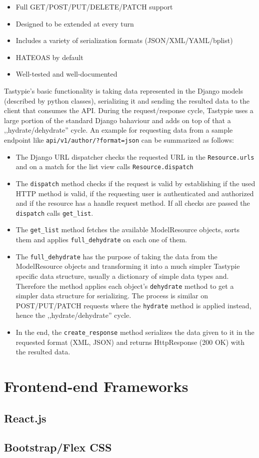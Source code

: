 \begin{itemize}
	\item Full GET/POST/PUT/DELETE/PATCH support
	\item Designed to be extended at every turn
	\item Includes a variety of serialization formats (JSON/XML/YAML/bplist)
	\item HATEOAS by default
	\item Well-tested and well-documented
\end{itemize}

Tastypie's basic functionality is taking data represented in the Django models (described by python classes), serializing it and sending the resulted data to the client that consumes the API. During the request/response cycle, Tastypie uses a large portion of the standard Django bahaviour and adds on top of that a ,,hydrate/dehydrate'' cycle. An example for requesting data from a sample endpoint like \texttt{api/v1/author/?format=json} can be summarized as follows:

\begin{itemize}
	\item The Django URL dispatcher checks the requested URL in the \texttt{Resource.urls} and on a match for the list view calls \texttt{Resource.dispatch}
	\item The \texttt{dispatch} method checks if the request is valid by establishing if the used HTTP method is valid, if the requesting user is authenticated and authorized and if the resource has a handle  request method. If all checks are passed the \texttt{dispatch} calls \texttt{get\_list}.
	\item The \texttt{get\_list} method fetches the available ModelResource objects, sorts them and applies \texttt{full\_dehydrate} on each one of them.
	\item The \texttt{full\_dehydrate} has the purpose of taking the data from the ModelResource objects and transforming it into a much simpler Tastypie specific data structure, usually a dictionary of simple data types and. Therefore the method applies each object's  \texttt{dehydrate} method to get a simpler data structure for serializing. The process is similar on  POST/PUT/PATCH requests where the \texttt{hydrate} method is applied instead, hence the ,,hydrate/dehydrate'' cycle.
	\item In the end, the \texttt{create\_response} method serializes the data given to it in the requested format (XML, JSON) and returns HttpResponse (200 OK) with the resulted data.
\end{itemize}


\section{Frontend-end Frameworks}
\label{sec:frontend}

\subsection{React.js}
\label{sub-sec:react}

\subsection{Bootstrap/Flex CSS}
\label{sub-sec:bootstrap}




